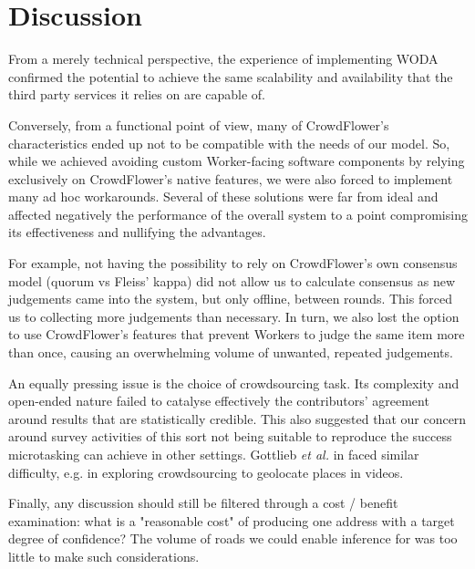 \section{Discussion}

From a merely technical perspective, the experience of implementing WODA confirmed the potential to achieve the same scalability and availability that the third party services it relies on are capable of.

Conversely, from a functional point of view, many of CrowdFlower's characteristics ended up not to be compatible with the needs of our model. So, while we achieved avoiding custom Worker-facing software components by relying exclusively on CrowdFlower's native features, we were also forced to implement many ad hoc workarounds. Several of these solutions were far from ideal and affected negatively the performance of the overall system to a point compromising its effectiveness and nullifying the advantages. 

For example, not having the possibility to rely on CrowdFlower's own consensus model (quorum vs Fleiss' kappa) did not allow us to calculate consensus as new judgements came into the system, but only offline, between rounds. This forced us to collecting more judgements than necessary. In turn, we also lost the option to use CrowdFlower's features that prevent Workers to judge the same item more than once, causing an overwhelming volume of unwanted, repeated judgements. 

An equally pressing issue is the choice of crowdsourcing task. Its complexity and open-ended nature failed to catalyse effectively the contributors' agreement around results that are statistically credible. This also suggested that our concern around survey activities of this sort not being suitable to reproduce the success microtasking can achieve in other settings. Gottlieb {\it et al.} in \cite{Gottlieb:2012fh} faced similar difficulty, e.g. in exploring crowdsourcing to geolocate places in videos.

Finally, any discussion should still be filtered through a cost / benefit examination: what is a "reasonable cost" of producing one address with a target degree of confidence? The volume of roads we could enable inference for was too little to make such considerations.
